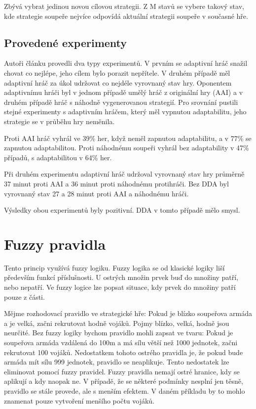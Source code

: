 Zbývá vybrat jedinou novou cílovou strategii. Z M stavů se vybere takový stav, kde strategie soupeře nejvíce odpovídá aktuální strategii soupeře v současné hře.

\subsection{Provedené experimenty}

Autoři článku provedli dva typy experimentů. V prvním se adaptivní hráč snažil chovat co nejlépe, jeho cílem bylo porazit nepřítele. V druhém případě měl adaptivní hráč za úkol udržovat co nejdéle vyrovnaný stav hry. Oponentem adaptivnímu hráči byl v jednom případě umělý hráč z originální hry (AAI) a v druhém případě hráč s náhodně vygenerovanou strategií. Pro srovnání pustili stejné experimenty s adaptivním hráčem, který měl vypnutou adaptabilitu, jeho strategie se v průběhu hry neměnila.

Proti AAI hráč vyhrál ve 39\% her, když neměl zapnutou adaptabilitu, a v 77\% se zapnutou adaptabilitou. Proti náhodnému soupeři vyhrál bez adaptability v 47\% případů, s adaptabilitou v 64\% her.

Při druhém experimentu adaptivní hráč udržoval vyrovnaný stav hry průměrně 37 minut proti AAI a 36 minut proti náhodnému protihráči. Bez DDA byl vyrovnaný stav 27 a 28 minut proti AAI a náhodnému hráči.

Výsledky obou experimentů byly pozitivní. DDA v tomto případě mělo smysl.

\section{Fuzzy pravidla} \label{sec:fuzzy}

Tento princip využívá fuzzy logiku. Fuzzy logika se od klasické logiky liší především funkcí příslušnosti. U ostrých množin prvek buď do množiny patří, nebo nepatří. Ve fuzzy logice lze popsat situace, kdy prvek do množiny patří pouze z části.

Mějme rozhodovací pravidlo ve strategické hře: Pokud je blízko soupeřova armáda a je velká, začni rekrutovat hodně vojáků. Pojmy blízko, velká, hodně jsou neurčité. Bez fuzzy logiky bychom pravidlo mohli zapsat ve tvaru: Pokud je soupeřova armáda vzdálená do 100m a má sílu větší než 1000 jednotek, začni rekrutovat 100 vojáků. Nedostatkem tohoto ostrého pravidla je, že pokud bude armáda mít sílu 999 jednotek, pravidlo se neaplikuje. Tento nedostatek lze eliminovat pomocí fuzzy pravidel. Fuzzy pravidla nemají ostré hranice, kdy se aplikují a kdy naopak ne. V případě, že se některé podmínky nesplní jen těsně, pravidlo se stále provede, ale s menším efektem. V daném příkladu by to mohlo znamenat pouze vytvoření menšího počtu vojáků.

